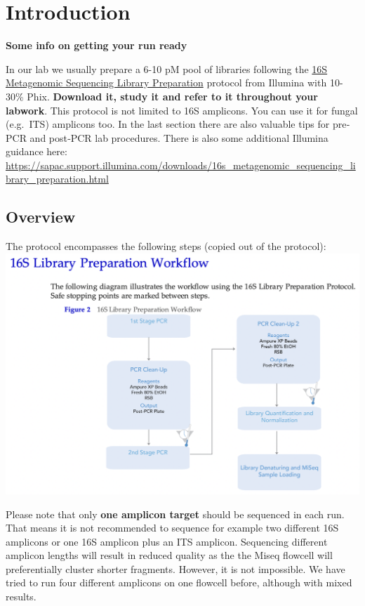 \documentclass[
]{book}
\begin{document}
\hypertarget{introduction}{%
\section{Introduction}\label{introduction}}

\textbf{Some info on getting your run ready}

In our lab we usually prepare a 6-10 pM pool of libraries following the \href{https://sapac.support.illumina.com/content/dam/illumina-support/documents/documentation/chemistry_documentation/16s/16s-metagenomic-library-prep-guide-15044223-b.pdf}{16S Metagenomic Sequencing Library
Preparation} protocol from Illumina with 10-30\% Phix. \textbf{Download it, study it and refer to it throughout your labwork}. This protocol is not limited to 16S amplicons. You can use it for fungal (e.g.~ITS) amplicons too. In the last section there are also valuable tips for pre‐PCR and post‐PCR lab procedures. There is also some additional Illumina guidance here: \url{https://sapac.support.illumina.com/downloads/16s_metagenomic_sequencing_library_preparation.html}

\hypertarget{overview}{%
\subsection{Overview}\label{overview}}

The protocol encompasses the following steps (copied out of the protocol):
\includegraphics{./img/16Slibraryprotocolworkflow.png}

Please note that only \textbf{one amplicon target} should be sequenced in each run. That means it is not recommended to sequence for example two different 16S amplicons or one 16S amplicon plus an ITS amplicon. Sequencing different amplicon lengths will result in reduced quality as the the Miseq flowcell will preferentially cluster shorter fragments. However, it is not impossible. We have tried to run four different amplicons on one flowcell before, although with mixed results.
\end{document}
